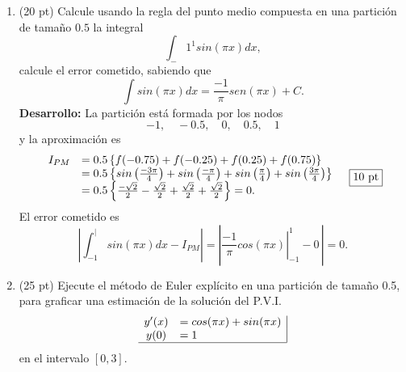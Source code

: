 \documentclass[11pt]{article}
\begin{document}
\begin{enumerate}
\newpage 
\item  (20 pt)
Calcule usando la regla del punto medio compuesta en una partici\'on de tama\~{n}o $0.5$ la integral
$$
\int_-1^1 sin(\pi x) dx,
$$
calcule el error cometido, sabiendo que 
$$
\int sin(\pi x)dx = \frac{-1}{\pi}sen(\pi x) +C.
$$
\textbf{Desarrollo:} 
 La partici\'on est\'a formada por los nodos 
 $$
 -1, \quad -0.5, \quad 0, \quad 0.5, \quad 1
 $$
 y la aproximaci\'on es
 $$
 \begin{array}{cl}
 I_{PM}
 &= 0.5 \left\{ f(-0.75)+f(-0.25)+f(0.25)+f(0.75)\right\} \\
 &= 0.5 \left\{sin\left(\frac{-3\pi}{4}\right)
     			+sin\left(\frac{-\pi}{4}\right)
                +sin\left(\frac{\pi}{4}\right)
                +sin\left(\frac{3\pi}{4}\right)\right\}\\
 &= 0.5 \left\{ \frac{-\sqrt{2}}{2}
    				-\frac{\sqrt{2}}{2}
                     +\frac{\sqrt{2}}{2}
                     +\frac{\sqrt{2}}{2}\right\}=0. 
 \end{array}\quad \fbox{10 pt}
 $$
El error cometido es 
$$
\displaystyle
\left|\int_{-1}^| sin(\pi x) dx - I_{PM}\right|=
\left|\left.\frac{-1}{\pi}cos(\pi x)\right|_{-1}^1 - 0\,\right|=0.
$$

\newpage
\item  (25 pt) Ejecute el m\'etodo de Euler expl\'icito en una partici\'on de tamaño 0.5, para graficar una estimaci\'on de la soluci\'on del P.V.I.
$$
\begin{array}{cl|}
y'(x)	& =cos(\pi x)+sin(\pi x)\\
y(0)	& =1 \\ \hline
\end{array}
$$
en el intervalo $[0,3]$.


\end{enumerate}
\end{document}
